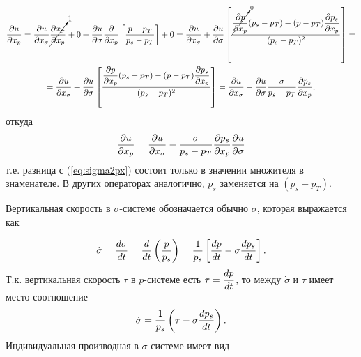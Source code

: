 \begin{multline*}
    \pd{u}{x_p}=
    \pd{u}{x_{\sigma}} \cancelto{1}{\pd{x_{\sigma}}{x_p}} + 0 + \pd{u}{\sigma}\pd{}{x_p} \left[ \frac{p-p_T}{p_s-p_T} \right] + 0 =
    \pd{u}{x_{\sigma}} + 
    \pd{u}{\sigma} 
        \left[ 
            \frac{ \cancelto{0}{ \pd{p}{x_p}}(p_s-p_T) - 
            (p-p_T)\pd{p_s}{x_p} } { (p_s-p_T)^2 }  
        \right] = \\
        = \pd{u}{x_{\sigma}} + 
        \pd{u}{\sigma} 
            \left[  
                \frac{ \pd{p}{x_p}(p_s-p_T) - (p-p_T) \pd{p_s}{x_p} }{ (p_s-p_T)^2 }
            \right] = 
        \pd{u}{x_{\sigma}} - \pd{u}{\sigma}\frac{\sigma}{p_s-p_T}\pd{p_s}{x_p},      
\end{multline*}
откуда
\begin{equation}
    \pd{u}{x_p}=\pd{u}{x_{\sigma}}-\frac{\sigma}{p_s-p_T}\pd{p_s}{x_p}\pd{u}{\sigma}
\end{equation}
т.е. разница с (\ref{eq:sigma2px}) состоит только в значении множителя в знаменателе. В других операторах аналогично, $p_s$ заменяется на $(p_s-p_T)$.
 
Вертикальная скорость в $\sigma$-системе обозначается обычно $\dot{\sigma}$, которая выражается как

\begin{equation}
    \dot{\sigma} = \td{\sigma}{t}=\td{}{t} \left( \frac{p}{p_s} \right) = \frac{1}{p_s} \left[ \td{p}{t} - \sigma\td{p_s}{t} \right]. 
\end{equation}
Т.к. вертикальная скорость  $\tau$ в $p$-системе есть $\tau=\td{p}{t}$, то между $\dot{\sigma}$ и $\tau$ имеет место соотношение
\begin{equation}
    \dot{\sigma}=\frac{1}{p_s} \left( \tau - \sigma\td{p_s}{t} \right).
\end{equation}
Индивидуальная производная в $\sigma$-системе имеет вид 

